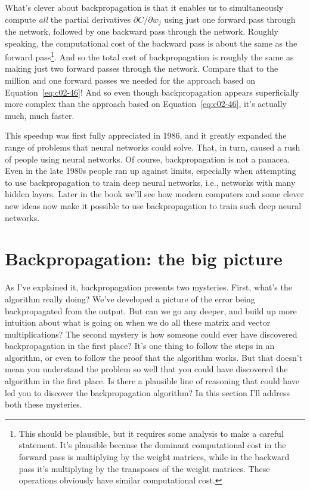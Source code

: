What's clever about backpropagation is that it enables us to simultaneously compute \textit{all} the partial derivatives $\partial C / \partial w_{j}$ using just one forward pass through the network, followed by one backward pass through the network. Roughly speaking, the computational cost of the backward pass is about the same as the forward pass\footnote{This should be plausible, but it requires some analysis to make a careful statement. It's plausible because the dominant computational cost in the forward pass is multiplying by the weight matrices, while in the backward pass it's multiplying by the transposes of the weight matrices. These operations obviously have similar computational cost.}. And so the total cost of backpropagation is roughly the same as making just two forward passes through the network. Compare that to the million and one forward passes we needed for the approach based on Equation~\ref{eq:c02-46}! And so even though backpropagation appears superficially more complex than the approach based on Equation~\ref{eq:c02-46}, it's actually much, much faster.

This speedup was first fully appreciated in 1986, and it greatly expanded the range of problems that neural networks could solve. That, in turn, caused a rush of people using neural networks. Of course, backpropagation is not a panacea. Even in the late 1980s people ran up against limits, especially when attempting to use backpropagation to train deep neural networks, i.e., networks with many hidden layers. Later in the book we'll see how modern computers and some clever new ideas now make it possible to use backpropagation to train such deep neural networks.

\section{Backpropagation: the big picture}
\label{sec:Backpropagation:thebigpicture}

As I've explained it, backpropagation presents two mysteries. First, what's the algorithm really doing? We've developed a picture of the error being backpropagated from the output. But can we go any deeper, and build up more intuition about what is going on when we do all these matrix and vector multiplications? The second mystery is how someone could ever have discovered backpropagation in the first place? It's one thing to follow the steps in an algorithm, or even to follow the proof that the algorithm works. But that doesn't mean you understand the problem so well that you could have discovered the algorithm in the first place. Is there a plausible line of reasoning that could have led you to discover the backpropagation algorithm? In this section I'll address both these mysteries.

